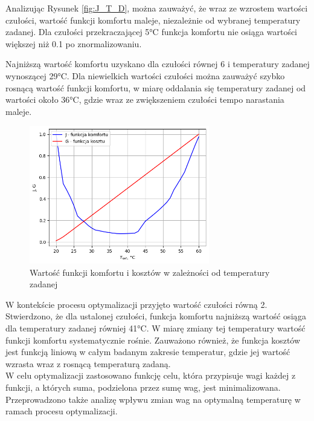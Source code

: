 \documentclass[a4paper,twoside,12pt]{book}
\begin{document}
Analizując Rysunek \ref{fig:J_T_D}, można zauważyć, że wraz ze wzrostem wartości czułości, wartość funkcji komfortu maleje, niezależnie od wybranej temperatury zadanej. Dla czułości przekraczającej 5°C funkcja komfortu nie osiąga wartości większej niż 0.1 po znormalizowaniu.

Najniższą wartość komfortu uzyskano dla czułości równej 6 i temperatury zadanej wynoszącej 29°C. Dla niewielkich wartości czułości można zauważyć szybko rosnącą wartość funkcji komfortu, w miarę oddalania się temperatury zadanej od wartości około 36°C, gdzie wraz ze zwiększeniem czułości tempo narastania maleje.\\



\begin{figure}[!h]
  \centering
  \includegraphics[width=0.7\textwidth]{img/j_g_2d.png}
  \caption{Wartość funkcji komfortu i kosztów w zależności od temperatury zadanej}
  \label{fig:etykieta-rysunku}
\end{figure}
W kontekście procesu optymalizacji przyjęto wartość czułości równą 2. Stwierdzono, że dla ustalonej czułości, funkcja komfortu najniższą wartość osiąga dla temperatury zadanej równiej 41°C. W miarę zmiany tej temperatury wartość funkcji komfortu systematycznie rośnie. Zauważono również, że funkcja kosztów jest funkcją liniową w całym badanym zakresie temperatur, gdzie jej wartość wzrasta wraz z rosnącą temperaturą zadaną.\\

W celu optymalizacji zastosowano funkcję celu, która przypisuje wagi każdej z funkcji, a których suma, podzielona przez sumę wag, jest minimalizowana. Przeprowadzono także analizę wpływu zmian wag na optymalną temperaturę w ramach procesu optymalizacji.
\end{document}
